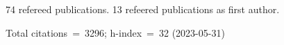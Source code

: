 74 refereed publications. 13 refeered publications as first author.

Total citations~=~3296; h-index~=~32 (2023-05-31)